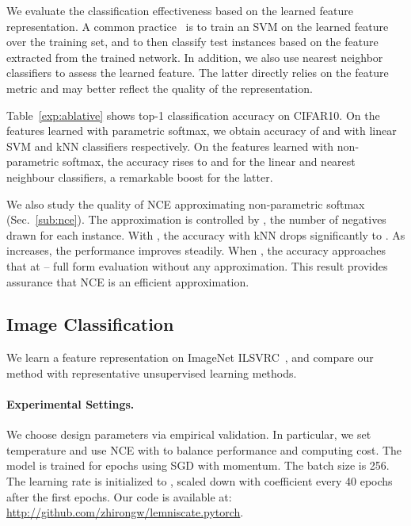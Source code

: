 We evaluate the classification effectiveness based on the learned feature representation.
A common practice~\cite{zhang2017split, doersch2015unsupervised, pathak2016context}
is to train an SVM on the learned feature over the training set, and 
to then classify test instances based on the feature extracted from the trained network.
In addition, we also use nearest neighbor classifiers to
assess the learned feature. The latter directly relies on the feature metric and
may better reflect the quality of the representation.

Table~\ref{exp:ablative} shows top-1 classification
accuracy on CIFAR10. On the features learned with parametric softmax, we obtain
accuracy of  and  with linear SVM and kNN classifiers respectively.  On the features learned with
non-parametric softmax, the accuracy 
rises to   and  for the linear and nearest neighbour classifiers, a remarkable
 boost for the latter.

We also study the quality of NCE approximating non-parametric softmax (Sec.~\ref{sub:nce}).
The approximation is controlled by ,
the number of negatives drawn for each instance.
With , the accuracy with kNN
drops significantly to . As  increases, the performance improves
steadily. When , the accuracy approaches that at  -- full form evaluation without any approximation.  This result provides assurance that NCE is an efficient approximation.


\subsection{Image Classification}

We learn a feature representation on ImageNet ILSVRC~\cite{russakovsky2015imagenet},
and compare our method with representative unsupervised learning methods.

\vspace{-9pt}
\paragraph{Experimental Settings.}
We choose design parameters via empirical validation.
In particular, we set temperature  and use NCE with  to balance performance and computing cost.
The model is trained for  epochs using
SGD with momentum. The batch size is 256.
The learning rate is initialized to ,
scaled down with coefficient  every 40 epochs after the first  epochs.
Our code is available at: \url{http://github.com/zhirongw/lemniscate.pytorch}.


